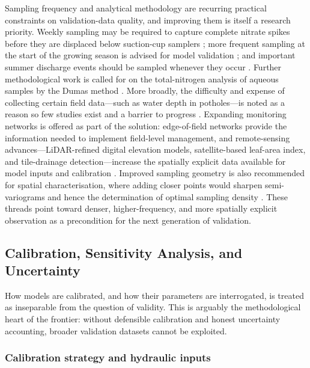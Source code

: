 \documentclass[11pt]{article}
\begin{document}
Sampling frequency and analytical methodology are recurring practical constraints on validation-data quality, and improving them is itself a research priority. Weekly sampling may be required to capture complete nitrate spikes before they are displaced below suction-cup samplers \parencite{Zotarelli2007}; more frequent sampling at the start of the growing season is advised for model validation \parencite{Kalita1998}; and important summer discharge events should be sampled whenever they occur \parencite{Tiemeyer2009}. Further methodological work is called for on the total-nitrogen analysis of aqueous samples by the Dumas method \parencite{Schindler1999}. More broadly, the difficulty and expense of collecting certain field data---such as water depth in potholes---is noted as a reason so few studies exist and a barrier to progress \parencite{Upadhyay2019}. Expanding monitoring networks is offered as part of the solution: edge-of-field networks provide the information needed to implement field-level management, and remote-sensing advances---LiDAR-refined digital elevation models, satellite-based leaf-area index, and tile-drainage detection---increase the spatially explicit data available for model inputs and calibration \parencite{Apostel2021}. Improved sampling geometry is also recommended for spatial characterisation, where adding closer points would sharpen semi-variograms and hence the determination of optimal sampling density \parencite{GALLICHAND1992}. These threads point toward denser, higher-frequency, and more spatially explicit observation as a precondition for the next generation of validation.

\subsection{Calibration, Sensitivity Analysis, and Uncertainty}

How models are calibrated, and how their parameters are interrogated, is treated as inseparable from the question of validity. This is arguably the methodological heart of the frontier: without defensible calibration and honest uncertainty accounting, broader validation datasets cannot be exploited.

\subsubsection{Calibration strategy and hydraulic inputs}
\end{document}
